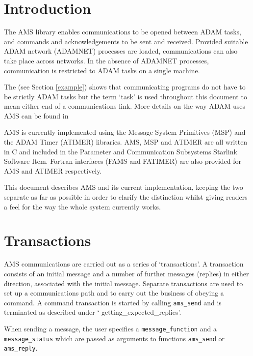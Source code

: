 \documentclass[twoside,11pt,nolof]{starlink}
\begin{document}
\scfrontmatter

\section{Introduction}
The AMS library enables communications to be opened between ADAM tasks, and
commands and acknowledgements to be sent and received. Provided suitable ADAM
network (ADAMNET) processes are loaded, communications can also take place
across networks.
In the absence of ADAMNET processes, communication is restricted to ADAM
tasks on a single machine.

The
 (see Section \ref{example})
shows that communicating programs do not have to be strictly ADAM tasks but
the term `task' is used throughout this document to mean either end of a
communications link.
More details on the way ADAM uses AMS can be found in

AMS is currently implemented using the Message System Primitives (MSP) and the
ADAM Timer (ATIMER) libraries.
AMS, MSP and ATIMER are all written in C and included in the Parameter and
Communication Subsystems
Starlink Software Item. Fortran interfaces (FAMS and FATIMER) are also provided
for AMS and ATIMER respectively.

This document describes AMS and its current implementation, keeping the two
separate as far as possible in order to clarify the distinction whilst giving
readers  a feel for the way the whole system currently works.

\section{Transactions}
AMS communications are carried out as a series of `transactions'. A
transaction consists of an initial message and a number of further messages
(replies) in either direction, associated with the initial message.
Separate transactions are used to set up a communications path and to carry
out the business of obeying a command.
A command transaction is started by calling
\texttt{ams\_send}
and is terminated as described under
`
{getting_expected_replies}'.

When sending a message, the user specifies a \texttt{message\_function} and a
\texttt{message\_status} which are passed as arguments to functions
\texttt{ams\_send}
or
\texttt{ams\_reply}.
\end{document}
